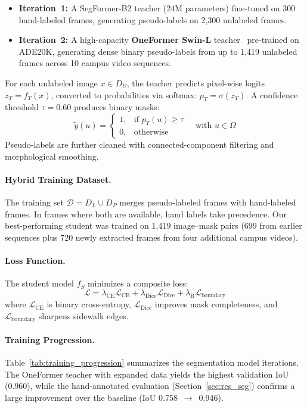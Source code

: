 \documentclass[a4paper,fleqn,10pt]{cas-dc}
\begin{document}
\begin{itemize}[nosep]
    \item \textbf{Iteration~1:} A SegFormer-B2 teacher (24M parameters) fine-tuned on 300 hand-labeled frames, generating pseudo-labels on 2,300 unlabeled frames.
    \item \textbf{Iteration~2:} A high-capacity \textbf{OneFormer Swin-L} teacher~\cite{oneformer} pre-trained on ADE20K, generating dense binary pseudo-labels from up to 1,419 unlabeled frames across 10 campus video sequences.
\end{itemize}

For each unlabeled image $x \in D_U$, the teacher predicts pixel-wise logits $z_T = f_T(x)$, converted to probabilities via softmax: $p_T = \sigma(z_T)$. A confidence threshold $\tau = 0.60$ produces binary masks:
\[
\tilde{y}(u) =
\begin{cases}
1,& \text{if } p_T(u) \ge \tau \\
0,& \text{otherwise}
\end{cases}
\quad \text{with } u \in \Omega
\]
Pseudo-labels are further cleaned with connected-component filtering and morphological smoothing.

\paragraph{Hybrid Training Dataset.}
The training set $\mathcal{D} = D_L \cup D_P$ merges pseudo-labeled frames with hand-labeled frames. In frames where both are available, hand labels take precedence. Our best-performing student was trained on 1,419 image--mask pairs (699 from earlier sequences plus 720 newly extracted frames from four additional campus videos).

\paragraph{Loss Function.}
The student model $f_S$ minimizes a composite loss:
\[
\mathcal{L} = \lambda_{\text{CE}} \mathcal{L}_{\text{CE}} + \lambda_{\text{Dice}} \mathcal{L}_{\text{Dice}} + \lambda_{\text{B}} \mathcal{L}_{\text{boundary}}
\]
where $\mathcal{L}_{\text{CE}}$ is binary cross-entropy, $\mathcal{L}_{\text{Dice}}$ improves mask completeness, and $\mathcal{L}_{\text{boundary}}$ sharpens sidewalk edges.

\paragraph{Training Progression.}
Table~\ref{tab:training_progression} summarizes the segmentation model iterations. The OneFormer teacher with expanded data yields the highest validation IoU (0.960), while the hand-annotated evaluation (Section~\ref{sec:res_seg}) confirms a large improvement over the baseline (IoU 0.758~$\to$~0.946).
\end{document}
